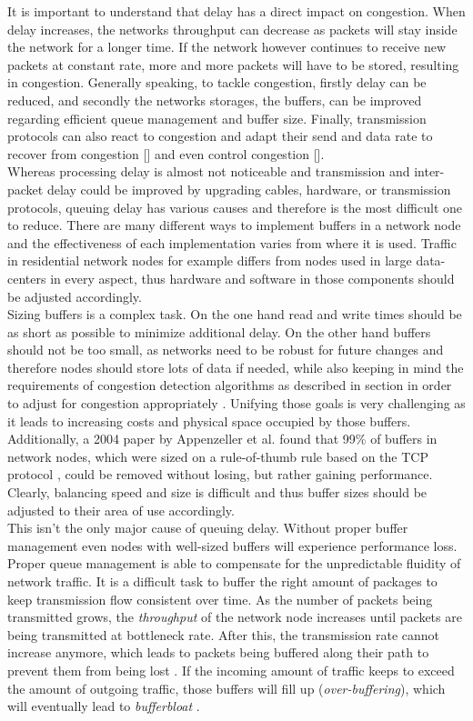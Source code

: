\documentclass[a4paper,conference]{IEEEtran}
\begin{document}
It is important to understand that delay has a direct impact on congestion. When delay increases, the networks throughput can decrease as packets will stay inside the network for a longer time. If the network however continues to receive new packets at constant rate, more and more packets will have to be stored, resulting in congestion. Generally speaking, to tackle congestion, firstly delay can be reduced, and secondly the networks storages, the buffers, can be improved regarding efficient queue management and buffer size. Finally, transmission protocols can also react to congestion and adapt their send and data rate to recover from congestion [] and even control congestion [].
\\Whereas processing delay is almost not noticeable and transmission and inter-packet delay could be improved by upgrading cables, hardware, or transmission protocols, queuing delay has various causes and therefore is the  most difficult one to reduce. There are many different ways to implement buffers in a network node and the effectiveness of each implementation varies from where it is used. Traffic in residential network nodes for example differs from nodes used in large data-centers in every aspect, thus hardware and software in those components should be adjusted accordingly.
\\Sizing buffers is a complex task. On the one hand read and write times should be as short as possible to minimize additional delay. On the other hand buffers should not be too small, as networks need to be robust for future changes and therefore nodes should store lots of data if needed, while also keeping in mind the requirements of congestion detection algorithms as described in section  in order to adjust for congestion appropriately \cite{staff2012bufferbloat}. Unifying those goals is very challenging as it leads to increasing costs and physical space occupied by those buffers. Additionally, a 2004 paper by Appenzeller et al. \cite{appenzeller2004sizing} found that 99\% of buffers in network nodes, which were sized on a rule-of-thumb rule based on the TCP protocol \cite{villamizar1994high}, could be removed without losing, but rather gaining performance. Clearly, balancing speed and size is difficult and thus buffer sizes should be adjusted to their area of use accordingly.
\\This isn't the only major cause of queuing delay. Without proper buffer management even nodes with well-sized buffers will experience performance loss. Proper queue management is able to compensate for the unpredictable fluidity of network traffic. It is a difficult task to buffer the right amount of packages to keep transmission flow consistent over time.
As the number of packets being transmitted grows, the \textit{throughput} of the network node increases until packets are being transmitted at bottleneck rate. After this, the transmission rate cannot increase anymore, which leads to packets being buffered along their path to prevent them from being lost \cite{gettys2012bufferbloat}. If the incoming amount of traffic keeps to exceed the amount of outgoing traffic, those buffers will fill up (\textit{over-buffering}), which will eventually lead to \textit{bufferbloat} \cite{Allman13commentson,6886125}.
\end{document}
